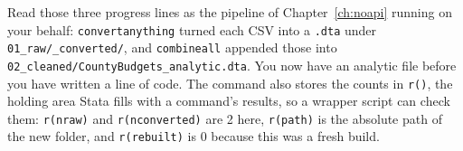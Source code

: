 Read those three progress lines as the pipeline of Chapter~\ref{ch:noapi} running on your behalf: \texttt{convertanything} turned each CSV into a \texttt{.dta} under \texttt{01\_raw/\_converted/}, and \texttt{combineall} appended those into \texttt{02\_cleaned/CountyBudgets\_analytic.dta}. You now have an analytic file before you have written a line of code. The command also stores the counts in \texttt{r()}, the holding area Stata fills with a command's results, so a wrapper script can check them: \texttt{r(nraw)} and \texttt{r(nconverted)} are 2 here, \texttt{r(path)} is the absolute path of the new folder, and \texttt{r(rebuilt)} is 0 because this was a fresh build.

